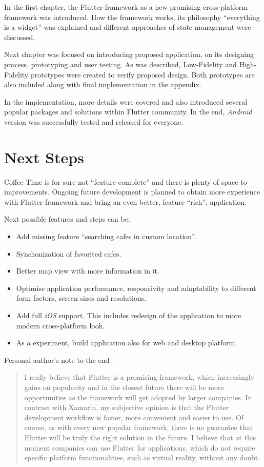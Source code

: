 \begin{conclusion}
In the first chapter, the Flutter framework as a new promising cross-platform framework was introduced. How the framework works, its philosophy ``everything is a widget'' was explained and different approaches of state management were discussed. 

Next chapter was focused on introducing proposed application, on its designing process, prototyping and user testing. As was described, Low-Fidelity and High-Fidelity prototypes were created to verify proposed design. Both prototypes are also included along with final implementation in the appendix. 

In the implementation, more details were covered and also introduced several popular packages and solutions within Flutter community. In the end, \textit{Android} version was successfully tested and released for everyone. 

\section{Next Steps}
Coffee Time is for sure not ``feature-complete'' and there is plenty of space to improvements. Ongoing future development is planned to obtain more experience with Flutter framework and bring an even better, feature ``rich'', application. 

Next possible features and steps can be:

\begin{itemize}
    \item Add missing feature ``searching cafes in custom location''.
    \item Synchonization of favorited cafes.
    \item Better map view with more information in it.
    \item Optimise application performance, responsivity and adaptability to different form factors, screen sizes and resolutions.
    \item Add full \textit{iOS} support. This includes redesign of the application to more modern cross-platform look. 
    \item As a experiment, build application also for web and desktop platform.
\end{itemize}

Personal author's note to the end

\begin{quote}
I really believe that Flutter is a promising framework, which increasingly gains on popularity and in the closest future there will be more opportunities as the framework will get adopted by larger companies. In contrast with Xamarin, my subjective opinion is that the Flutter development workflow is faster, more convenient and easier to use. Of course, as with every new popular framework, there is no guarantee that Flutter will be truly the right solution in the future. I believe that at this moment companies can use Flutter for applications, which do not require specific platform functionalities, such as virtual reality, without any doubt.
\end{quote}
\end{conclusion}